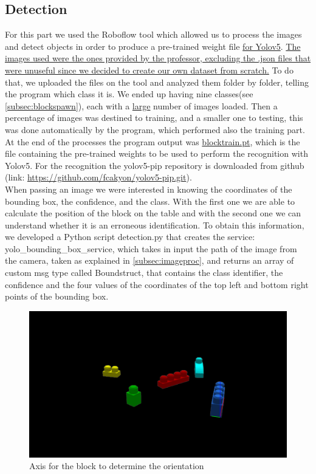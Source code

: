 \documentclass[12pt,a4paper]{article}
\begin{document}
\subsection{Detection}\label{subsec:detect}
For this part we used the Roboflow tool which allowed us to process the images and detect objects in order to produce a pre-trained weight file \uline{for Yolov5}. \uline{The images used were the ones provided by the professor, excluding the .json files that were unuseful since we decided to create our own dataset from scratch.} To do that, we uploaded the files on the tool and analyzed them folder by folder, telling the program which class it is. We ended up having nine classes(see \ref{subsec:blockspawn}), each with a \uline{large} number of images loaded. Then a percentage of images was destined to training, and a smaller one to testing, this was done automatically by the program, which performed also the training part. At the end of the processes the program output was \uline{blocktrain.pt}, which is the file containing the pre-trained weights to be used to perform the recognition with Yolov5. For the recognition the yolov5-pip repository is downloaded from github (link: \url{https://github.com/fcakyon/yolov5-pip.git}).\\
When passing an image we were interested in knowing the coordinates of the bounding box, the confidence, and the class. With the first one we are able to calculate the position of the block on the table and with the second one we can understand whether it is an erroneous identification. To obtain this information, we developed a Python script detection.py that creates the service: yolo\_bounding\_box\_service, which takes in input the path of the image from the camera, taken as explained in \ref{subsec:imageproc}, and returns an array of custom msg type called Boundstruct, that contains the class identifier, the confidence and the four values of the coordinates of the top left and bottom right points of the bounding box.
\begin{center}
    \begin{figure}
        \centering
        \includegraphics[width=1.0\columnwidth]{images/Obj1.png}
        \caption{Axis for the block to determine the orientation}
        \label{fig:obj1}
    \end{figure}
\end{center}
\end{document}
